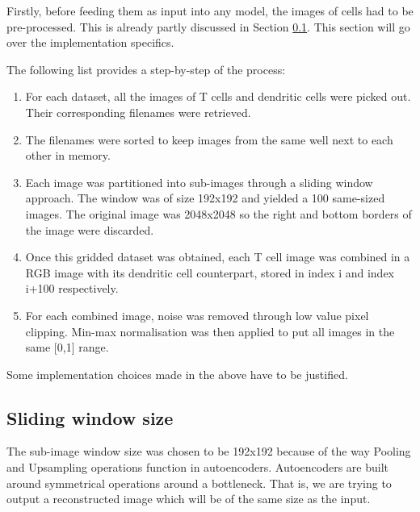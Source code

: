 Firstly, before feeding them as input into any model, the images of cells had to be pre-processed. This is already partly discussed in Section \ref{}. This section will go over the implementation specifics.

\bigskip
The following list provides a step-by-step of the process:
\begin{enumerate}
    \item For each dataset, all the images of T cells and dendritic cells were picked out. Their corresponding filenames were retrieved.
    \item The filenames were sorted to keep images from the same well next to each other in memory.
    \item Each image was partitioned into sub-images through a sliding window approach. The window was of size 192x192 and yielded a 100 same-sized images. The original image was 2048x2048 so the right and bottom borders of the image were discarded.
    \item Once this gridded dataset was obtained, each T cell image was combined in a RGB image with its dendritic cell counterpart, stored in index i and index i+100 respectively.
    \item For each combined image, noise was removed through low value pixel clipping. Min-max normalisation was then applied to put all images in the same [0,1] range.
\end{enumerate}

Some implementation choices made in the above have to be justified.

\subsection{Sliding window size}

The sub-image window size was chosen to be 192x192 because of the way Pooling and Upsampling operations function in autoencoders. Autoencoders are built around symmetrical operations around a bottleneck. That is, we are trying to output a reconstructed image which will be of the same size as the input.

